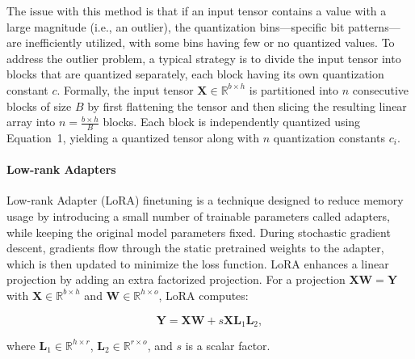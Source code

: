 The issue with this method is that if an input tensor contains a value with a large magnitude (i.e., an outlier), the quantization bins—specific bit patterns—are inefficiently utilized, with some bins having few or no quantized values. To address the outlier problem, a typical strategy is to divide the input tensor into blocks that are quantized separately, each block having its own quantization constant $c$. Formally, the input tensor $\mathbf{X} \in \mathbb{R}^{b \times h}$ is partitioned into $n$ consecutive blocks of size $B$ by first flattening the tensor and then slicing the resulting linear array into $n = \frac{b \times h}{B}$ blocks. Each block is independently quantized using Equation~1, yielding a quantized tensor along with $n$ quantization constants $c_i$.

\paragraph{Low-rank Adapters} Low-rank Adapter (LoRA) finetuning \citep{hu2021lora} is a technique designed to reduce memory usage by introducing a small number of trainable parameters called adapters, while keeping the original model parameters fixed. During stochastic gradient descent, gradients flow through the static pretrained weights to the adapter, which is then updated to minimize the loss function. LoRA enhances a linear projection by adding an extra factorized projection. For a projection ${\mathbf{X} \mathbf{W} = \mathbf{Y}}$ with $\mathbf{X} \in \mathbb{R}^{b \times h}$ and $\mathbf{W} \in \mathbb{R}^{h \times o}$, LoRA computes:

\begin{equation}
    \mathbf{Y} = \mathbf{X}\mathbf{W} + s\mathbf{X}\mathbf{L}_1\mathbf{L}_2,
\end{equation}

where $\mathbf{L}_1 \in \mathbb{R}^{h \times r}$, $\mathbf{L}_2 \in \mathbb{R}^{r \times o}$, and $s$ is a scalar factor.

